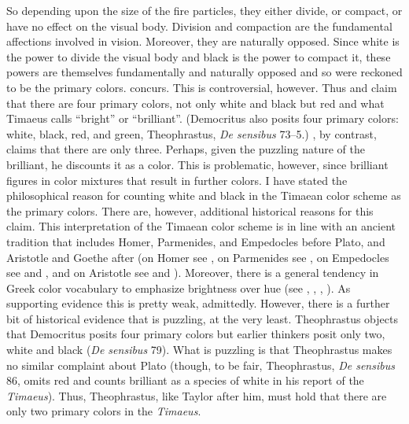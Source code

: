 So depending upon the size of the fire particles, they either divide, or compact, or have no effect on the visual body. Division and compaction are the fundamental affections involved in vision. Moreover, they are naturally opposed. Since white is the power to divide the visual body and black is the power to compact it, these powers are themselves fundamentally and naturally opposed and so were reckoned to be the primary colors. \citet[480--1]{Taylor:1928qb} concurs. This is controversial, however. Thus \citet{Brisson:1997qr} and \citet{Ierodiakonou:2005ly} claim that there are four primary colors, not only white and black but red and what Timaeus calls ``bright'' or ``brilliant''. (Democritus also posits four primary colors: white, black, red, and green, Theophrastus, \emph{De sensibus} 73--5.) \citet[277]{Cornford:1935fk}, by contrast, claims that there are only three. Perhaps, given the puzzling nature of the brilliant, he discounts it as a color. This is problematic, however, since brilliant figures in color mixtures that result in further colors. I have stated the philosophical reason for counting white and black in the Timaean color scheme as the primary colors. There are, however, additional historical reasons for this claim. This interpretation of the Timaean color scheme is in line with an ancient tradition that includes Homer, Parmenides, and Empedocles before Plato, and Aristotle and Goethe after (on Homer see \citealt{Gladstone:1858fk}, on Parmenides see \citealt[chapter 5.3]{Kalderon:2015fr}, on Empedocles see \citealt{Ierodiakonou:2005fk} and \citealt[chapter 5.4]{Kalderon:2015fr}, and on Aristotle see \citealt{Sorabji:2022qf} and \citealt[chapter 6]{Kalderon:2015fr}). Moreover, there is a general tendency in Greek color vocabulary to emphasize brightness over hue (see \citealt{Gladstone:1858fk}, \citealt{Platnauer:1921bh}, \citealt{Osbourne:1968vn}, \citealt[chapter 1]{Lloyd:2007fk}). As supporting evidence this is pretty weak, admittedly. However, there is a further bit of historical evidence that is puzzling, at the very least. Theophrastus objects that Democritus posits four primary colors but earlier thinkers posit only two, white and black (\emph{De sensibus} 79). What is puzzling is that Theophrastus makes no similar complaint about Plato (though, to be fair, Theophrastus, \emph{De sensibus} 86, omits red and counts brilliant as a species of white in his report of the \emph{Timaeus}). Thus, Theophrastus, like Taylor after him, must hold that there are only two primary colors in the \emph{Timaeus}.


